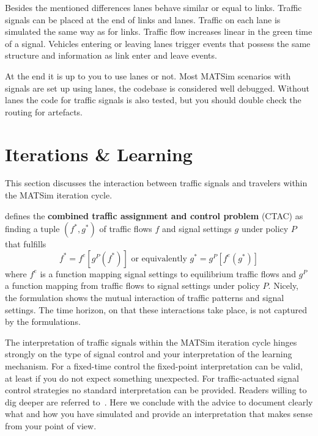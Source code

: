 Besides the mentioned differences lanes behave similar or equal to links.  
Traffic signals can be placed at the end of links and lanes. 
Traffic on each lane is simulated the same way as for links. 
Traffic flow increases linear in the green time of a signal. 
Vehicles entering or leaving lanes trigger events that possess the same structure and information as link enter and leave events.

At the end it is up to you to use lanes or not. 
Most MATSim scenarios with signals are set up using lanes, the codebase is considered well debugged. 
Without lanes the code for traffic signals is also tested, but you should double check the routing for artefacts. 

\section{Iterations \& Learning}
\label{sec:signals_iterations_learning}

This section discusses the interaction between traffic signals and travelers within the MATSim iteration cycle. 

\citet{Meneguzzer1997ModelReviewTrafficAssignmentSignalControl} defines the {\bf combined traffic assignment and control problem} (CTAC) as finding a tuple $(f^{*}, g^{*})$ of traffic flows $f$ and signal settings $g$ under policy $P$ that fulfills  
\[
f^{*} = f^{e}[g^{P}(f^{*})] \mbox{  or  equivalently } g^{*} = g^{P}[f^{e}(g^{*})]
\]
where $f^{e}$ is a function mapping signal settings to equilibrium traffic flows and $g^{P}$ a function mapping from traffic flows to signal settings under policy $P$.  
Nicely, the formulation shows the mutual interaction of traffic patterns and signal settings. 
The time horizon, on that these interactions take place, is not captured by the formulations. 

The interpretation of traffic signals within the MATSim iteration cycle hinges strongly on the type of signal control and your interpretation of the learning mechanism. 
For a fixed-time control the fixed-point interpretation can be valid, at least if you do not expect something unexpected. 
For traffic-actuated signal control strategies no standard interpretation can be provided. 
Readers willing to dig deeper are referred to~\citet[pp.~75][]{Grether2014PhD}.  
Here we conclude with the advice to document clearly what and how you have simulated and provide an interpretation that makes sense from your point of view.    

